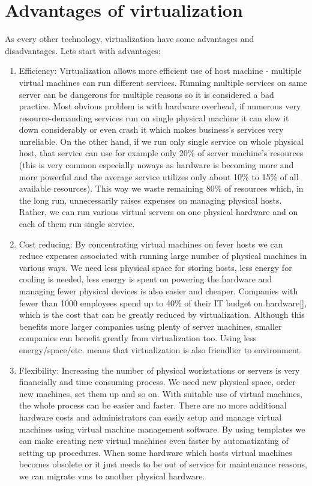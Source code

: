 \begin{itemize}
\end{itemize}

\section{Advantages of virtualization}
As every other technology, virtualization have some advantages and disadvantages. Lets start with advantages:
\begin{enumerate}
\item Efficiency: Virtualization allows more efficient use of host machine - multiple virtual machines can run different services. Running multiple services on same server can be dangerous for multiple reasons so it is considered a bad practice. Most obvious problem is with hardware overhead, if numerous very resource-demanding services run on single physical machine it can slow it down considerably or even crash it which makes business's services very unreliable. On the other hand, if we run only single service on whole physical host, that service can use for example only 20\% of server machine's resources (this is very common especially noways as hardware is becoming more and more powerful and the average service utilizes only about 10\% to 15\% of all available resources). This way we waste remaining 80\% of resources which, in the long run, unnecessarily raises expenses on managing physical hosts. Rather, we can run various virtual servers on one physical hardware and on each of them run single service.
\item Cost reducing: By concentrating virtual machines on fever hosts we can reduce expenses associated with running large number of physical machines in various ways. We need less physical space for storing hosts, less energy for cooling is needed, less energy is spent on powering the hardware and managing fewer physical devices is also easier and cheaper. Companies with fewer than 1000 employees spend up to 40\% of their IT budget on hardware[], which is the cost that can be greatly reduced by virtualization. Although this benefits more larger companies using plenty of server machines, smaller companies can benefit greatly from virtualization too. Using less energy/space/etc. means that virtualization is also friendlier to environment.
\item Flexibility: Increasing the number of physical workstations or servers is very financially and time consuming process. We need new physical space, order new machines, set them up and so on. With suitable use of virtual machines, the whole process can be easier and faster. There are no more additional hardware costs and administrators can easily setup and manage virtual machines using virtual machine management software. By using templates we can make creating new virtual machines even faster by automatizating of setting up procedures. When some hardware which hosts virtual machines becomes obsolete or it just needs to be out of service for maintenance reasons, we can migrate vms to another physical hardware.

\end{enumerate}
